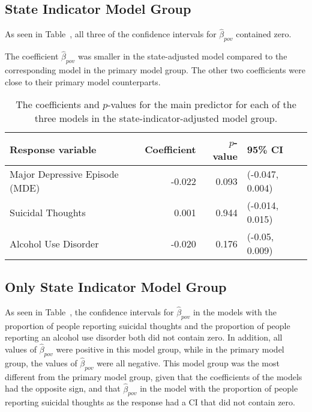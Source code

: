 \documentclass{article}
\begin{document}
\subsection{State Indicator Model Group}

As seen in Table~\label{tab:state-ind-model-results},
all three of the confidence intervals for
$\hat{\beta}_{pov}$ contained zero.

The coefficient $\hat{\beta}_{pov}$ was smaller
in the state-adjusted model compared to the
corresponding model in the
primary model group.
The other two coefficients were close to their
primary model counterparts.

\begin{table}[!htb]
\begin{center}
\begin{tabular}{l r r l}
    \toprule
    Response variable & Coefficient & $p$-value & 95\% CI\\
    \midrule
    Major Depressive Episode (MDE) & -0.022 & 0.093 & (-0.047, 0.004)\\
    Suicidal Thoughts & 0.001 & 0.944 & (-0.014, 0.015)\\
    Alcohol Use Disorder & -0.020 & 0.176 & (-0.05, 0.009)\\
    \bottomrule
\end{tabular}
\caption{\label{tab:state-ind-model-results} The coefficients and $p$-values
    for the main predictor for each of the three models
    in the state-indicator-adjusted model group.
}
\end{center}
\end{table}

\subsection{Only State Indicator Model Group}


As seen in Table~\label{tab:state-ind-only-model-results},
the confidence intervals for $\hat{\beta}_{pov}$
in the models with the proportion of people
reporting suicidal thoughts
and the proportion of people reporting an alcohol use disorder
both did not contain zero.
In addition, all values of $\hat{\beta}_{pov}$
were positive in this model group,
while in the primary model group,
the values of $\hat{\beta}_{pov}$
were all negative.
This model group was the most different from the primary model group,
given that the coefficients of the models had the opposite sign,
and that $\hat{\beta}_{pov}$ in the model
with the proportion of people reporting suicidal thoughts
as the response had a CI that did not contain zero.
\end{document}
